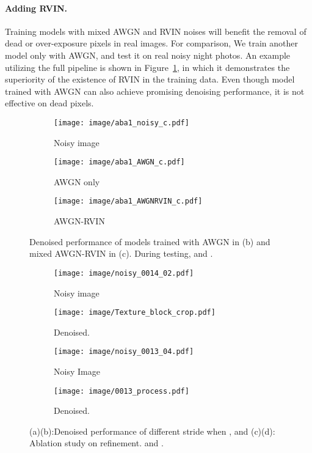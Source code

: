 \documentclass[letterpaper]{article} \usepackage{aaai20}  \usepackage{times}  \usepackage{helvet} \usepackage{courier}  \usepackage{comment}
\begin{document}
\paragraph{Adding RVIN.}
Training models with mixed AWGN and RVIN noises will benefit the removal of dead or over-exposure pixels in real images. For comparison, We train another model only with AWGN, and test it on real noisy night photos. An example utilizing the full pipeline is shown in Figure~\ref{fig:RVIN_ab}, in which it demonstrates the superiority of the existence of RVIN in the training data. Even though model trained with AWGN can also achieve promising denoising performance, it is not effective on dead pixels. 
\begin{figure}[t]
	\centering
	\begin{subfigure}{0.32\linewidth} 
		\texttt{[image: image/aba1\_noisy\_c.pdf]}
		\caption{Noisy image} \end{subfigure}
	\begin{subfigure}{0.32\linewidth} 
		\texttt{[image: image/aba1\_AWGN\_c.pdf]}
		\caption{AWGN only} \end{subfigure}
		\begin{subfigure}{0.32\linewidth} 
		\texttt{[image: image/aba1\_AWGNRVIN\_c.pdf]}
		\caption{AWGN-RVIN} \end{subfigure}
	\caption{Denoised performance of models trained with AWGN in (b) and mixed AWGN-RVIN in (c). During testing,  and .  }
	\label{fig:RVIN_ab}
\end{figure}
\begin{figure}[t]
	\centering
	\begin{subfigure}{0.24\linewidth} 
		\texttt{[image: image/noisy\_0014\_02.pdf]}
		\caption{Noisy image} \end{subfigure}
	\begin{subfigure}{0.24\linewidth} 
		\texttt{[image: image/Texture\_block\_crop.pdf]}
		\caption{Denoised.} \end{subfigure}
	\begin{subfigure}{0.24\linewidth} 
		\texttt{[image: image/noisy\_0013\_04.pdf]}
		\caption{Noisy Image} \end{subfigure}
	\begin{subfigure}{0.24\linewidth} 
		\texttt{[image: image/0013\_process.pdf]}
		\caption{Denoised.} \end{subfigure}
	\caption{(a)(b):Denoised performance of different stride  when , and (c)(d): Ablation study on refinement.  and . }
	\label{fig:process_ab}
\end{figure}
\end{document}
